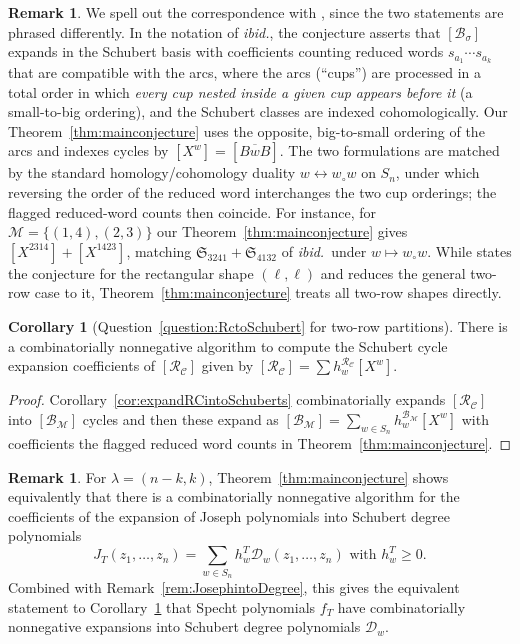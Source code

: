\documentclass[11pt]{amsart}
\theoremstyle{definition}
\newtheorem{cor}[thm]{Corollary}
\newtheorem{rem}[thm]{Remark}
\numberwithin{equation}{section}
\begin{document}
\begin{rem}
\label{rem:PSAdictionary}
We spell out the correspondence with \cite[Conjecture~2]{sabandoalvarez2026idealsdefiningcomponentstworow}, since the two statements are phrased differently. In the notation of \textit{ibid.}, the conjecture asserts that $[\mathcal{B}_\sigma]$ expands in the Schubert basis with coefficients counting reduced words $s_{a_1}\cdots s_{a_k}$ that are compatible with the arcs, where the arcs (``cups'') are processed in a total order in which \textit{every cup nested inside a given cup appears before it} (a small-to-big ordering), and the Schubert classes are indexed cohomologically. Our Theorem~\ref{thm:mainconjecture} uses the opposite, big-to-small ordering of the arcs and indexes cycles by $[X^w]=[\overline{BwB}]$. The two formulations are matched by the standard homology/cohomology duality $w\leftrightarrow w_\circ w$ on $S_n$, under which reversing the order of the reduced word interchanges the two cup orderings; the flagged reduced-word counts then coincide. For instance, for $\mathcal{M}=\{(1,4),(2,3)\}$ our Theorem~\ref{thm:mainconjecture} gives $[X^{2314}]+[X^{1423}]$, matching $\mathfrak{S}_{3241}+\mathfrak{S}_{4132}$ of \textit{ibid.}\ under $w\mapsto w_\circ w$. While \cite{sabandoalvarez2026idealsdefiningcomponentstworow} states the conjecture for the rectangular shape $(\ell,\ell)$ and reduces the general two-row case to it, Theorem~\ref{thm:mainconjecture} treats all two-row shapes directly.
\end{rem}


\begin{cor}[{Question~\ref{question:RctoSchubert} for two-row partitions}]
\label{cor:RCtoSchub}
    There is a combinatorially nonnegative algorithm to compute the Schubert cycle expansion coefficients of $[\mathcal{R}_{\mathcal{C}}]$ given by $[\mathcal{R}_{\mathcal{C}}]=\sum h^{\mathcal{R}_\mathcal{C}}_w [X^w]$.
\end{cor}
\begin{proof}
Corollary~\ref{cor:expandRCintoSchuberts} combinatorially expands $[\mathcal{R}_{\mathcal{C}}]$ into $[\mathcal{B}_\mathcal{M}]$ cycles and then these expand as $[\mathcal{B}_\mathcal{M}]=\sum_{w\in S_n}h^{\mathcal{B}_{\mathcal{M}}}_w[X^w]$ with coefficients the flagged reduced word counts in Theorem~\ref{thm:mainconjecture}.
\end{proof}
\begin{rem}
    For $\lambda=(n-k,k)$, Theorem~\ref{thm:mainconjecture} shows equivalently that there is a combinatorially nonnegative algorithm for the coefficients of the expansion of Joseph polynomials into Schubert degree polynomials
    $$J_T(z_1,\ldots,z_n)=\sum_{w\in S_n}h_w^T\mathcal{D}_w(z_1,\ldots,z_n)\text{ with }h_w^T\ge 0.$$
   Combined with Remark~\ref{rem:JosephintoDegree}, this gives the equivalent statement to Corollary~\ref{cor:RCtoSchub} that Specht polynomials $f_T$ have combinatorially nonnegative expansions into Schubert degree polynomials $\mathcal{D}_w$.
\end{rem}
\end{document}
